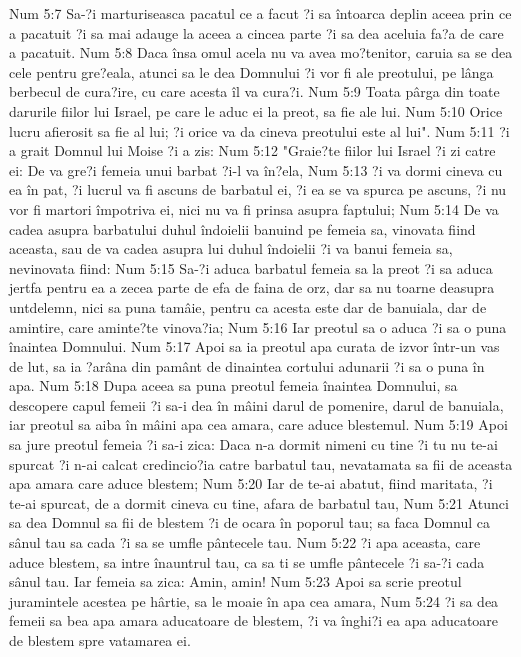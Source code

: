 Num 5:7  Sa-?i marturiseasca pacatul ce a facut ?i sa întoarca deplin aceea prin ce a pacatuit ?i sa mai adauge la aceea a cincea parte ?i sa dea aceluia fa?a de care a pacatuit.
Num 5:8  Daca însa omul acela nu va avea mo?tenitor, caruia sa se dea cele pentru gre?eala, atunci sa le dea Domnului ?i vor fi ale preotului, pe lânga berbecul de cura?ire, cu care acesta îl va cura?i.
Num 5:9  Toata pârga din toate darurile fiilor lui Israel, pe care le aduc ei la preot, sa fie ale lui.
Num 5:10  Orice lucru afierosit sa fie al lui; ?i orice va da cineva preotului este al lui".
Num 5:11  ?i a grait Domnul lui Moise ?i a zis:
Num 5:12  "Graie?te fiilor lui Israel ?i zi catre ei: De va gre?i femeia unui barbat ?i-l va în?ela,
Num 5:13  ?i va dormi cineva cu ea în pat, ?i lucrul va fi ascuns de barbatul ei, ?i ea se va spurca pe ascuns, ?i nu vor fi martori împotriva ei, nici nu va fi prinsa asupra faptului;
Num 5:14  De va cadea asupra barbatului duhul îndoielii banuind pe femeia sa, vinovata fiind aceasta, sau de va cadea asupra lui duhul îndoielii ?i va banui femeia sa, nevinovata fiind:
Num 5:15  Sa-?i aduca barbatul femeia sa la preot ?i sa aduca jertfa pentru ea a zecea parte de efa de faina de orz, dar sa nu toarne deasupra untdelemn, nici sa puna tamâie, pentru ca acesta este dar de banuiala, dar de amintire, care aminte?te vinova?ia;
Num 5:16  Iar preotul sa o aduca ?i sa o puna înaintea Domnului.
Num 5:17  Apoi sa ia preotul apa curata de izvor într-un vas de lut, sa ia ?arâna din pamânt de dinaintea cortului adunarii ?i sa o puna în apa.
Num 5:18  Dupa aceea sa puna preotul femeia înaintea Domnului, sa descopere capul femeii ?i sa-i dea în mâini darul de pomenire, darul de banuiala, iar preotul sa aiba în mâini apa cea amara, care aduce blestemul.
Num 5:19  Apoi sa jure preotul femeia ?i sa-i zica: Daca n-a dormit nimeni cu tine ?i tu nu te-ai spurcat ?i n-ai calcat credincio?ia catre barbatul tau, nevatamata sa fii de aceasta apa amara care aduce blestem;
Num 5:20  Iar de te-ai abatut, fiind maritata, ?i te-ai spurcat, de a dormit cineva cu tine, afara de barbatul tau,
Num 5:21  Atunci sa dea Domnul sa fii de blestem ?i de ocara în poporul tau; sa faca Domnul ca sânul tau sa cada ?i sa se umfle pântecele tau.
Num 5:22  ?i apa aceasta, care aduce blestem, sa intre înauntrul tau, ca sa ti se umfle pântecele ?i sa-?i cada sânul tau. Iar femeia sa zica: Amin, amin!
Num 5:23  Apoi sa scrie preotul juramintele acestea pe hârtie, sa le moaie în apa cea amara,
Num 5:24  ?i sa dea femeii sa bea apa amara aducatoare de blestem, ?i va înghi?i ea apa aducatoare de blestem spre vatamarea ei.
